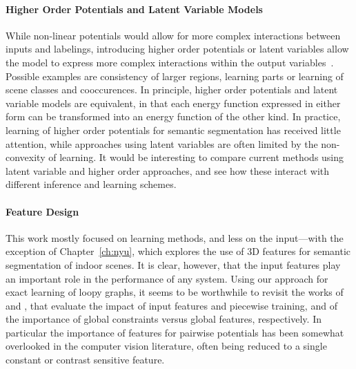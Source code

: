 \documentclass[12pt,toc=bibnumbered, a4paper,twoside,DIV=11,BCOR=1cm]{scrbook}
\begin{document}
\paragraph{Higher Order Potentials and Latent Variable Models}
While non-linear potentials would allow for more complex interactions between
inputs and labelings, introducing higher order potentials or latent variables
allow the model to express more complex interactions within the output
variables~\citep{dann2012pottics, kohli2009robust}. Possible examples are
consistency of larger regions, learning parts or learning of scene classes and
cooccurences.
In principle, higher order potentials and latent variable models are
equivalent, in that each energy function expressed in either form can be
transformed into an energy function of the other kind. In practice, learning of
higher order potentials for semantic segmentation has received little
attention, while approaches using latent variables are often limited by
the non-convexity of learning.  It would be interesting to compare current
methods using latent variable and higher order approaches, and see how these
interact with different inference and learning schemes.
%
\paragraph{Feature Design}
This work mostly focused on learning methods, and less on the input---with
the exception of Chapter~\ref{ch:nyu}, which explores the use of 3D features
for semantic segmentation of indoor scenes. It is clear, however, that
the input features play an important role in the performance of any system.
Using our approach for exact learning of loopy graphs, it seems to be worthwhile to
revisit the works of \citet{nowozin2010parameter} and \citet{lucchi2011spatial},
that evaluate the impact of input features and piecewise training, and of the importance
of global constraints versus global features, respectively.
In particular the importance of features for pairwise potentials has been
somewhat overlooked in the computer vision literature, often being reduced to a
single constant or contrast sensitive feature.



\end{document}
